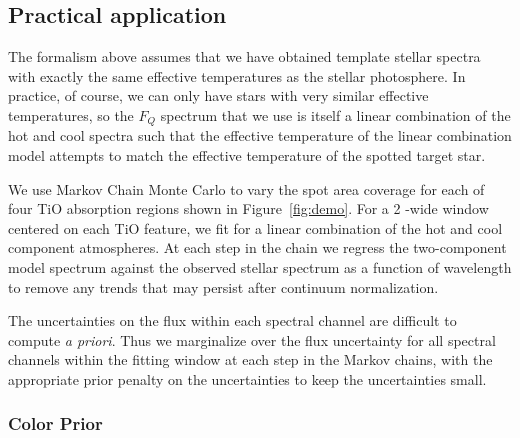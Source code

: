 \subsection{Practical application}

The formalism above assumes that we have obtained template stellar spectra with exactly the same effective temperatures as the stellar photosphere. In practice, of course, we can only have stars with very similar effective temperatures, so the $F_Q$ spectrum that we use is itself a linear combination of the hot and cool spectra such that the effective temperature of the linear combination model attempts to match the effective temperature of the spotted target star. 

We use Markov Chain Monte Carlo
\citep[emcee;][]{Foreman-Mackey2013}
to vary the spot area coverage for each of four TiO absorption regions shown in Figure~\ref{fig:demo}. 
For a 2 \angstrom-wide window centered on each TiO feature, we fit for a linear combination of the hot and cool component atmospheres. At each step in the chain we regress the two-component model spectrum against the observed stellar spectrum as a function of wavelength to remove any trends that may persist after continuum normalization. %

The uncertainties on the flux within each spectral channel are difficult to compute \textit{a priori}. Thus we marginalize over the flux uncertainty for all spectral channels within the fitting window at each step in the Markov chains, with the appropriate prior penalty on the uncertainties to keep the uncertainties small. 

\subsubsection{Color Prior} \label{sec:colorprior}

